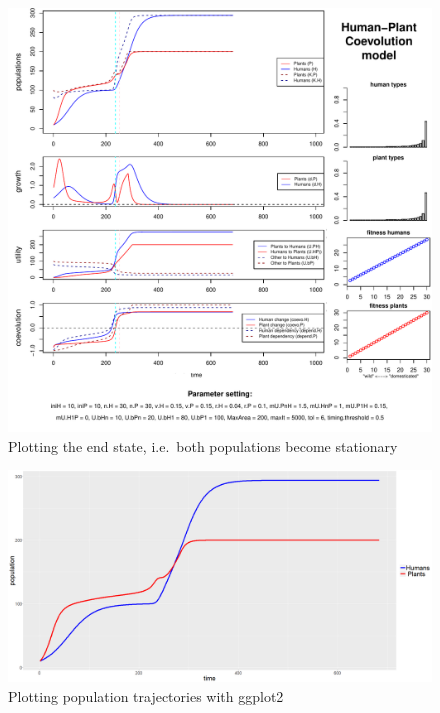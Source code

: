 \documentclass[]{book}
\begin{document}
\newpage

\begin{figure}
\centering
\includegraphics{hpcModel-exploration_files/figure-latex/1runcoevocoetaplot-1.pdf}
\caption{\label{fig:1runcoevocoetaplot}Plotting the end state, i.e.~both populations become stationary}
\end{figure}

\newpage

\begin{figure}
\includegraphics[width=1\linewidth]{plots/1_singleRun-ggplot-coevo.coeta} \caption{Plotting population trajectories with ggplot2}\label{fig:1runcoevocoetaggplotprint}
\end{figure}
\end{document}
